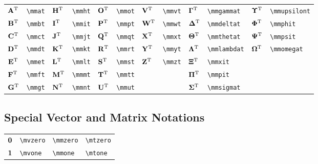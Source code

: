 \documentclass{article}
\begin{document}
\begin{tabular}{*{12}{l}}
${{\mathbf A}^{\text T}}$ & \lstinline`\mmat` & ${{\mathbf H}^{\text T}}$ & \lstinline`\mmht` & ${{\mathbf O}^{\text T}}$ & \lstinline`\mmot` & ${{\mathbf V}^{\text T}}$ & \lstinline`\mmvt` & ${{\bm \Gamma}^{\text T}}$ & \lstinline`\mmgammat` & ${{\bm \Upsilon}^{\text T}}$ & \lstinline`\mmupsilont`\\
${{\mathbf B}^{\text T}}$ & \lstinline`\mmbt` & ${{\mathbf I}^{\text T}}$ & \lstinline`\mmit` & ${{\mathbf P}^{\text T}}$ & \lstinline`\mmpt` & ${{\mathbf W}^{\text T}}$ & \lstinline`\mmwt` & ${{\bm \Delta}^{\text T}}$ & \lstinline`\mmdeltat` & ${{\bm \Phi}^{\text T}}$ & \lstinline`\mmphit`\\
${{\mathbf C}^{\text T}}$ & \lstinline`\mmct` & ${{\mathbf J}^{\text T}}$ & \lstinline`\mmjt` & ${{\mathbf Q}^{\text T}}$ & \lstinline`\mmqt` & ${{\mathbf X}^{\text T}}$ & \lstinline`\mmxt` & ${{\bm \Theta}^{\text T}}$ & \lstinline`\mmthetat` & ${{\bm \Psi}^{\text T}}$ & \lstinline`\mmpsit`\\
${{\mathbf D}^{\text T}}$ & \lstinline`\mmdt` & ${{\mathbf K}^{\text T}}$ & \lstinline`\mmkt` & ${{\mathbf R}^{\text T}}$ & \lstinline`\mmrt` & ${{\mathbf Y}^{\text T}}$ & \lstinline`\mmyt` & ${{\bm \Lambda}^{\text T}}$ & \lstinline`\mmlambdat` & ${{\bm \Omega}^{\text T}}$ & \lstinline`\mmomegat`\\
${{\mathbf E}^{\text T}}$ & \lstinline`\mmet` & ${{\mathbf L}^{\text T}}$ & \lstinline`\mmlt` & ${{\mathbf S}^{\text T}}$ & \lstinline`\mmst` & ${{\mathbf Z}^{\text T}}$ & \lstinline`\mmzt` & ${{\bm \Xi}^{\text T}}$ & \lstinline`\mmxit` & \\
${{\mathbf F}^{\text T}}$ & \lstinline`\mmft` & ${{\mathbf M}^{\text T}}$ & \lstinline`\mmmt` & ${{\mathbf T}^{\text T}}$ & \lstinline`\mmtt` &  &  & ${{\bm \Pi}^{\text T}}$ & \lstinline`\mmpit` & \\
${{\mathbf G}^{\text T}}$ & \lstinline`\mmgt` & ${{\mathbf N}^{\text T}}$ & \lstinline`\mmnt` & ${{\mathbf U}^{\text T}}$ & \lstinline`\mmut` &  &  & ${{\bm \Sigma}^{\text T}}$ & \lstinline`\mmsigmat` & \\
\end{tabular}


\subsection{Special Vector and Matrix Notations}
\begin{tabular}{*{4}{l}}
${\mathbf 0}$ & \lstinline`\mvzero` & \lstinline`\mmzero` & \lstinline`\mtzero` \\
${\mathbf 1}$ & \lstinline`\mvone` & \lstinline`\mmone` & \lstinline`\mtone` \\
\end{tabular}
\end{document}
